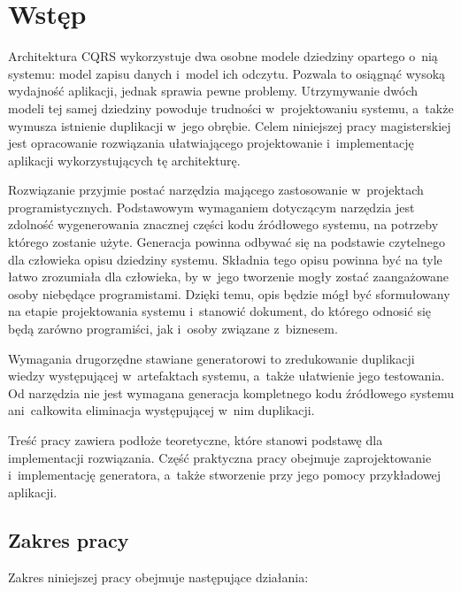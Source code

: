 \chapter{Wstęp} \label{chap:intro}

Architektura CQRS wykorzystuje dwa osobne modele dziedziny opartego o~nią systemu: model zapisu danych i~model ich odczytu.
Pozwala to osiągnąć wysoką wydajność aplikacji, jednak sprawia pewne problemy.
Utrzymywanie dwóch modeli tej samej dziedziny powoduje trudności w~projektowaniu systemu, a~także wymusza istnienie duplikacji w~jego obrębie.
Celem niniejszej pracy magisterskiej jest opracowanie rozwiązania ułatwiającego projektowanie i~implementację aplikacji wykorzystujących tę architekturę.

Rozwiązanie przyjmie postać narzędzia mającego zastosowanie w~projektach programistycznych.
Podstawowym wymaganiem dotyczącym narzędzia jest zdolność wygenerowania znacznej części kodu źródłowego systemu, na potrzeby którego zostanie użyte.
Generacja powinna odbywać się na podstawie czytelnego dla człowieka opisu dziedziny systemu.
Składnia tego opisu powinna być na tyle łatwo zrozumiała dla człowieka, by w~jego tworzenie mogły zostać zaangażowane osoby niebędące programistami.
Dzięki temu, opis będzie mógł być sformułowany na etapie projektowania systemu i~stanowić dokument, do którego odnosić się będą zarówno programiści, jak i~osoby związane z~biznesem.

Wymagania drugorzędne stawiane generatorowi to zredukowanie duplikacji wiedzy występującej w~artefaktach systemu, a~także ułatwienie jego testowania.
Od narzędzia nie jest wymagana generacja kompletnego kodu źródłowego systemu ani~całkowita eliminacja występującej w~nim duplikacji.

Treść pracy zawiera podłoże teoretyczne, które stanowi podstawę dla implementacji rozwiązania.
Część praktyczna pracy obejmuje zaprojektowanie i~implementację generatora, a~także stworzenie przy jego pomocy przykładowej aplikacji.



\section{Zakres pracy} \label{sec:intro:scope}

Zakres niniejszej pracy obejmuje następujące działania:

